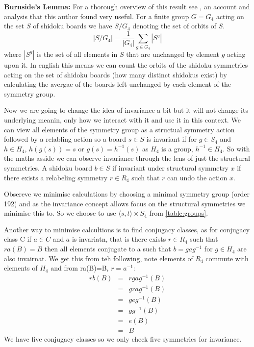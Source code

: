 \documentclass[a4paper,11pt]{report}
\begin{document}
\textbf{Burnside's Lemma:} For a thorough overview of this result see \cite{analysis and applications of burnsides lemma jenny jin}, an account and analysis that this author found very useful. For a finite group $G=G_4$ acting on the set $S$ of shidoku boards we have $S/G_4$ denoting the set of orbits of $S$. 
\begin{equation} |S/G_4|=\frac{1}{|G_4|}\sum_{g\in G_4}|S^g|\end{equation}
where $|S^g|$ is the set of all elements in $S$ that are unchanged by element $g$ acting upon it. In english this means we can count the orbits of the shidoku symmetries acting on the set of shidoku boards (how many distinct shidokus exist) by calculating the avergae of the boards left unchanged by each element of the symmetry group. 

Now we are going to change the idea of invariance a bit but it will not change its underlying meanin, only how we interact with it and use it in this context. We can view all elements of the symmetry group as a structual symmetry action followed by a relabling action so a board $s\in S$ is invariant if for $g\in S_4$ and $h\in H_4$, $h(g(s))=s$ or $g(s)=h^{-1}(s)$ as $H_4 $ is a group, $h^{-1}\in H_4$. So with the maths asside we can observe invariance through the lens of just the structural symmetries. A shidoku board $b\in S$ if invariant under structural symmetry $x$ if there exists a  relabeling symmetry $r\in R_4$ such that $r$ can undo the action $x$.

Obsereve we minimise calculations by choosing a minimal symmetry group (order 192) and as the invariance concept allows focus on the structural symmetries we minimise this to. So we choose to use $\langle s,t \rangle \times S_4$ from \ref{table:groups}.

Another way to minimise calcultions is to find conjugacy classes, as for conjugacy class C if $a\in C$ and $a$ is invariatn, that is there exists $r\in R_4$ such that$ra(B)=B$ then all elements conjugate to a such that $b=gag^{-1}$ for $g\in H_4$ are also invairnat. We get this from teh following, note elements of $R_4$ commute with elements of $H_4$ and from ra(B)=B, $r=a^{-1}$:
\begin{eqnarray}
rb(B)&=&rgag^{-1}(B)\\
&=&grag^{-1}(B)\\
&=&geg^{-1}(B)\\
&=&gg^{-1}(B)\\
&=&e(B)\\
&=&B
\end{eqnarray}
We have five conjugacy classes so we only check five symmetries for invariance. 
\end{document}
